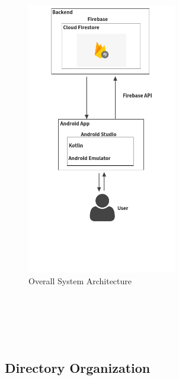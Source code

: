 \documentclass[conference]{IEEEtran}
\numberwithin{figure}{subsection}
\begin{document}
\\ \hspace*{\fill} \\
\\ \hspace*{\fill} \\

\begin{figure}[h]
    \centering
    \hfill
    \includegraphics[width=6.5cm]
    {bibtex/images/Overall Architecture.png}
    \hfill
    \caption{Overall System Architecture}
\end{figure}



\\ \hspace*{\fill} \\
\\ \hspace*{\fill} \\

\subsection{Directory Organization}
\\ \hspace*{\fill} \\
\end{document}
